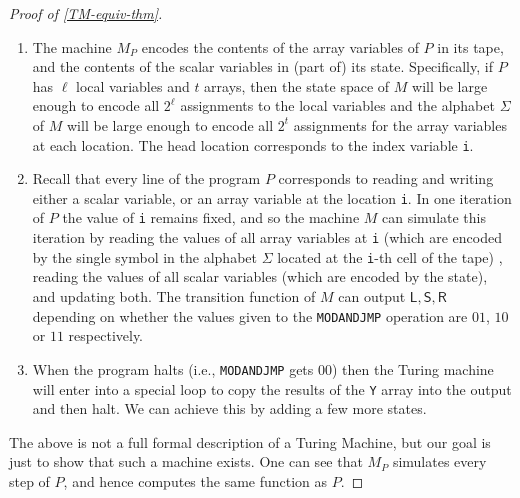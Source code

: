 \begin{proof}[Proof of \cref{TM-equiv-thm}]
\begin{enumerate}
\def\labelenumi{\arabic{enumi}.}
\item
  The machine \(M_P\) encodes the contents of the array variables of
  \(P\) in its tape, and the contents of the scalar variables in (part
  of) its state. Specifically, if \(P\) has \(\ell\) local variables and
  \(t\) arrays, then the state space of \(M\) will be large enough to
  encode all \(2^\ell\) assignments to the local variables and the
  alphabet \(\Sigma\) of \(M\) will be large enough to encode all
  \(2^t\) assignments for the array variables at each location. The head
  location corresponds to the index variable \texttt{i}.
\item
  Recall that every line of the program \(P\) corresponds to reading and
  writing either a scalar variable, or an array variable at the location
  \texttt{i}. In one iteration of \(P\) the value of \texttt{i} remains
  fixed, and so the machine \(M\) can simulate this iteration by reading
  the values of all array variables at \texttt{i} (which are encoded by
  the single symbol in the alphabet \(\Sigma\) located at the
  \texttt{i}-th cell of the tape) , reading the values of all scalar
  variables (which are encoded by the state), and updating both. The
  transition function of \(M\) can output
  \(\mathsf{L},\mathsf{S},\mathsf{R}\) depending on whether the values
  given to the \texttt{MODANDJMP} operation are \(01\), \(10\) or \(11\)
  respectively.
\item
  When the program halts (i.e., \texttt{MODANDJMP} gets \(00\)) then the
  Turing machine will enter into a special loop to copy the results of
  the \texttt{Y} array into the output and then halt. We can achieve
  this by adding a few more states.
\end{enumerate}

The above is not a full formal description of a Turing Machine, but our
goal is just to show that such a machine exists. One can see that
\(M_P\) simulates every step of \(P\), and hence computes the same
function as \(P\).

\end{proof}

\hypertarget{polyequivrem}{}

